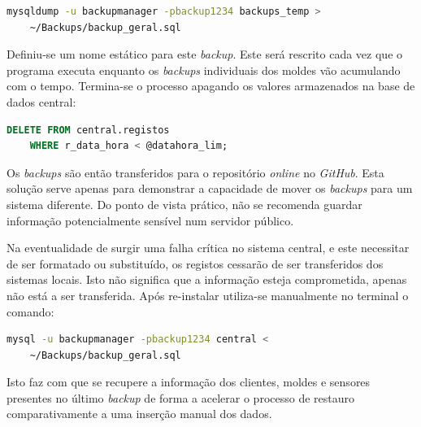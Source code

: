 \documentclass[11pt,twoside,a4paper]{report}
\begin{document}
\begin{lstlisting}[language = bash]
	mysqldump -u backupmanager -pbackup1234 backups_temp >
	~/Backups/backup_geral.sql
\end{lstlisting}
Definiu-se um nome estático para este \textit{backup}. Este será rescrito cada vez que o programa executa enquanto os \textit{backups} individuais dos moldes vão acumulando com o tempo. Termina-se o processo apagando os valores armazenados na base de dados central:
\begin{lstlisting}[language = SQL]
	DELETE FROM central.registos
	WHERE r_data_hora < @datahora_lim;
\end{lstlisting}
Os \textit{backups} são então transferidos para o repositório \textit{online} no \textit{GitHub}. Esta solução serve apenas para demonstrar a capacidade de mover os \textit{backups} para um sistema diferente. Do ponto de vista prático, não se recomenda guardar informação potencialmente sensível num servidor público.\par 
Na eventualidade de surgir uma falha crítica no sistema central, e este necessitar de ser formatado ou substituído, os registos cessarão de ser transferidos dos sistemas locais. Isto não significa que a informação esteja comprometida, apenas não está a ser transferida. Após re-instalar utiliza-se manualmente no terminal o comando:
	\begin{lstlisting}[language = bash]
	mysql -u backupmanager -pbackup1234 central <
	~/Backups/backup_geral.sql
\end{lstlisting}
Isto faz com que se recupere a informação dos clientes, moldes e sensores presentes no último \textit{backup} de forma a acelerar o processo de restauro comparativamente a uma inserção manual dos dados.
\end{document}

